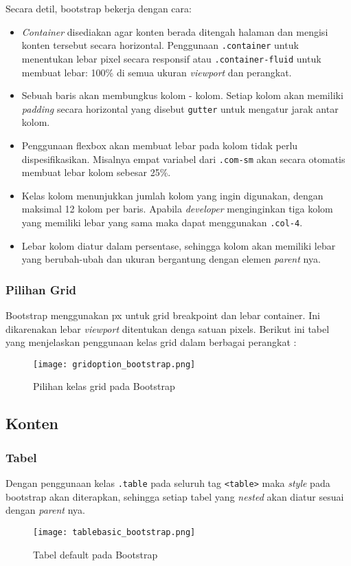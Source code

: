 Secara detil, bootstrap bekerja dengan cara:
\begin{itemize}
\item \textit{Container} disediakan agar konten berada ditengah halaman dan mengisi konten tersebut secara horizontal. Penggunaan \verb|.container| untuk menentukan lebar pixel secara responsif atau \verb|.container-fluid| untuk membuat lebar: 100\%  di semua ukuran \textit{viewport} dan perangkat.
\item Sebuah baris akan membungkus kolom - kolom. Setiap kolom akan memiliki \textit{padding} secara horizontal yang disebut \verb|gutter| untuk mengatur jarak antar kolom.
\item Penggunaan flexbox akan membuat lebar pada kolom tidak perlu dispesifikasikan. Misalnya empat variabel dari \verb|.com-sm| akan secara otomatis membuat lebar kolom sebesar 25\%.
\item Kelas kolom menunjukkan jumlah kolom yang ingin digunakan, dengan maksimal 12 kolom per baris. Apabila \textit{developer} menginginkan tiga kolom yang memiliki lebar yang sama maka dapat menggunakan \texttt{.col-4}.
\item Lebar kolom diatur dalam persentase, sehingga kolom akan memiliki lebar yang berubah-ubah dan ukuran bergantung dengan elemen \textit{parent} nya.
\end{itemize}
\subsubsection{Pilihan Grid}
Bootstrap menggunakan px untuk grid breakpoint dan lebar container. Ini dikarenakan lebar \textit{viewport} ditentukan denga satuan pixels.
Berikut ini tabel yang menjelaskan penggunaan kelas grid dalam berbagai perangkat :
\begin{figure} [H]
	\centering  
	\texttt{[image: gridoption\_bootstrap.png]}  
	\caption{Pilihan kelas grid pada Bootstrap} 
\end{figure}

\subsection{Konten}
\subsubsection{Tabel}
Dengan penggunaan kelas \verb|.table| pada seluruh tag \texttt{<table>} maka \textit{style} pada bootstrap akan diterapkan, sehingga setiap tabel yang \textit{nested} akan diatur sesuai dengan \textit{parent} nya.
\begin{figure} [H]
	\centering  
	\texttt{[image: tablebasic\_bootstrap.png]}  
	\caption{Tabel default pada Bootstrap} 
\end{figure}

